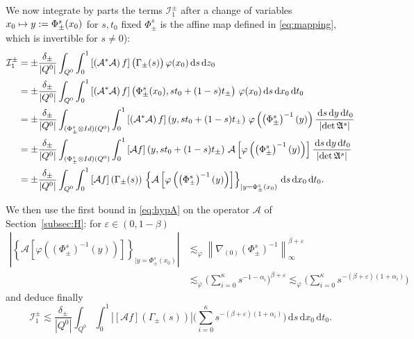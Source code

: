 \documentclass[10pt]{amsart}
\newcommand\mto{\mathchoice{\longmapsto}{\mapsto}{\mapsto}{\mapsto}}
\let\epsilon\varepsilon
\theoremstyle{definition}
\newcommand{\cA}{{\mathcal A}}
\newcommand{\cI}{{\mathcal I}}
\newcommand{\I}{\textup{Id}}\let\Id\I
\newcommand{\dd}{{\, \mathrm d}}
\begin{document}
We now integrate by parts the terms $\cI^\pm _1$ after a
change of variables $x_0 \mto y:= \Phi^s_\pm(x_0)$ for
$s,t_0$ fixed $\Phi^s_\pm$ is the affine map defined in \eqref{eq:mapping}, which is invertible for $s
\not =0$):
\begin{equation*}
\begin{aligned}
\cI_1^\pm & = \pm\frac{\delta_\pm}{|Q^0|} \int_{Q^0} \int_0^1
\left[ \left(\mathcal A^* \mathcal A \right) f\right]
\big(\Gamma_\pm(s)\big) \, \varphi(x_0)\dd s\dd z_0 \\
& = \pm\frac{\delta_\pm}{|Q^0|}\int_{Q^0} \int_0^1
\left[ \left(\mathcal A^* \mathcal A \right) f\right]
\left(\Phi^s_\pm (x_0),st_0 + (1-s)t_\pm
\right) \, \varphi(x_0)\dd s\dd x_0 \dd t_0 \\
& = \pm \frac{\delta_\pm}{|Q^0|} \int_{(\Phi^s_\pm \otimes \I)(Q^0)} \int_0^1
\left[ \left(\mathcal A^* \mathcal A \right) f\right]
\left(y,st_0 + (1-s)t_\pm \right) \, \varphi
\left(\left(\Phi^s_\pm\right)^{-1}(y)\right) \frac{\dd s
\dd y \dd t_0}{\left| \det \mathfrak
A^s \right|} \\
& = \pm \frac{\delta_\pm}{|Q^0|} \int_{(\Phi^s_\pm \otimes
\I)(Q^0)} \int_0^1 \left[ \mathcal A f\right]
\left(y,st_0 + (1-s)t_\pm \right) \, \cA\left[\varphi
\left(\left(\Phi^s_\pm \right)^{-1} (y)\right)\right]
\frac{\dd s \dd y \dd t_0}{\left| \det \mathfrak A^s \right|} \\
& = \pm \frac{\delta_\pm}{|Q^0|} \int_{Q^0} \int_0^1
\left[ \mathcal A f\right]
\left(\Gamma_\pm(s) \right) \, \left\{ \cA\left[\varphi
\left(\left(\Phi^s_\pm \right)^{-1} (y)\right)\right]
\right\}_{|y=\Phi^s_\pm(x_0)} \dd s \dd x_0 \dd t_0.
\end{aligned}
\end{equation*}

We then use the first bound in \eqref{eq:hypA} on the operator $\mathcal A$ of Section~\ref{subsec:H}: for $\epsilon \in (0, 1-\beta)$
\begin{align*}
\left| \left\{ \cA\left[\varphi
\left(\left(\Phi^s_\pm \right)^{-1} (y)\right)\right]
\right\}_{|y=\Phi^s_\pm(x_0)} \right|
& \lesssim_\varphi
\left\| \nabla_{(0)} \left(\Phi^s_\pm \right)^{-1}
\right\|_\infty ^{\beta +\epsilon}\\
& \lesssim_\varphi \biggl(\sum_{i=0} ^\kappa s^{-1-\alpha_i}
\biggr)^{\beta +\epsilon} \lesssim_\varphi \biggl(\sum_{i=0} ^\kappa
s^{-(\beta+\epsilon)(1+\alpha_i)} \biggr)
\end{align*}
and deduce finally
\begin{equation*}
\cI_1^\pm \lesssim \frac{\delta_\pm}{|Q^0|} \int_{Q^0} \int_0^1
\left| \left[ \mathcal A f\right]
\left(\Gamma_\pm(s) \right) \right| \biggl(\sum_{i=0}
^\kappa s^{-(\beta+\epsilon)(1+\alpha_i)} \biggr) \dd s \dd x_0 \dd
t_0.
\end{equation*}
\end{document}

